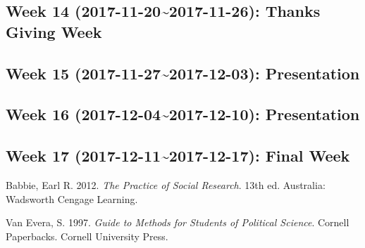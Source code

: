 \documentclass[11pt,]{article}
\begin{document}
\subsection{Week 14 (2017-11-20\textasciitilde{}2017-11-26): Thanks
Giving Week}\label{week-14-2017-11-202017-11-26-thanks-giving-week}

\subsection{Week 15 (2017-11-27\textasciitilde{}2017-12-03):
Presentation}\label{week-15-2017-11-272017-12-03-presentation}

\subsection{Week 16 (2017-12-04\textasciitilde{}2017-12-10):
Presentation}\label{week-16-2017-12-042017-12-10-presentation}

\subsection*{Week 17 (2017-12-11\textasciitilde{}2017-12-17): Final
Week}\label{week-17-2017-12-112017-12-17-final-week}

\hypertarget{refs}{}
\hypertarget{ref-Babbie2012}{}
Babbie, Earl R. 2012. \emph{The Practice of Social Research}. 13th ed.
Australia: Wadsworth Cengage Learning.

\hypertarget{ref-VanEvera1997}{}
Van Evera, S. 1997. \emph{Guide to Methods for Students of Political
Science}. Cornell Paperbacks. Cornell University Press.
\end{document}
